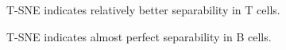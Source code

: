 \documentclass[3p,authoryear,preprint,12pt]{elsarticle}
\makeatletter
\def\fixFloatSize#1{}%
\makeatother
\begin{document}
\egroup
\bgroup
\fixFloatSize{img/TtSNE.png}
\begin{figure}[!htbp]
	\centering \makeatletter{}
	\makeatother 
	\caption{{T-SNE indicates relatively better separability in T cells.}}
	\label{f-c2b15a1baca9}
\end{figure}
\egroup
\bgroup
\fixFloatSize{img/BtSNE.png}
\begin{figure}[!htbp]
	\centering \makeatletter{}
	\makeatother 
	\caption{{T-SNE indicates almost perfect separability in B cells.}}
	\label{f-c2b15a1baca9}
\end{figure}
\egroup
\bgroup
    
\end{document}

